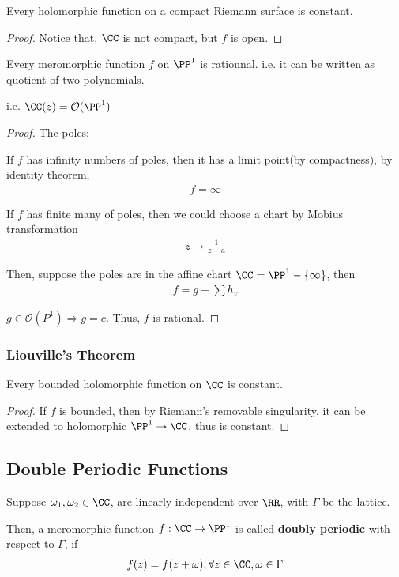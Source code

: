 \documentclass[Total.tex]{subfiles}
\begin{document}
			\begin{corollary}
				Every holomorphic function on a compact Riemann surface is constant. 
			\end{corollary}
			\begin{proof}
				Notice that, $\CC$ is not compact, but $f$ is open. 
			\end{proof}
			
			\begin{corollary}
				Every meromorphic function $f$ on $\PP^1$ is rationnal. i.e. it can be written as quotient of two polynomials. 
				
				i.e. $\CC(z)=\mathcal{O}(\PP^1)$
			\end{corollary}
			\begin{proof}
				The poles:
				
				If $f$ has infinity numbers of poles, then it has a limit point(by compactness), by identity theorem,
				\begin{gather*}
					f=\infty
				\end{gather*}
				
				If $f$ has finite many of poles, then we could choose a chart by Mobius transformation
				\begin{gather*}
					z\mapsto \frac{1}{z-a}
				\end{gather*}
				
				Then, suppose the poles are in the affine chart $\CC=\PP^1-\{\infty\}$, then
				\begin{gather*}
					f=g+\sum h_v
				\end{gather*}
				
				$g\in \mathcal{O}(P^1)\Rightarrow g=c$. Thus, $f$ is rational. 
			\end{proof}
			\subsubsection{Liouville's Theorem}
				\begin{theorem}
					Every bounded holomorphic function on $\CC$ is constant. 
				\end{theorem}
				\begin{proof}
					If $f$ is bounded, then by Riemann's removable singularity, it can be extended to holomorphic $\PP^1\rightarrow \CC$, thus is constant. 
				\end{proof}
			\subsection{Double Periodic Functions}
				\begin{Def}
					Suppose $\omega_1,\omega_2\in \CC$, are linearly independent over $\RR$, with $\Gamma$ be the lattice. 
					
					Then, a meromorphic function $f:\CC\rightarrow \PP^1$ is called \textbf{doubly periodic} with respect to $\Gamma$, if
					\begin{gather*}
						f(z)=f(z+\omega),\forall z\in \CC,\omega\in \Gamma
					\end{gather*}
				\end{Def}
				
\end{document}
